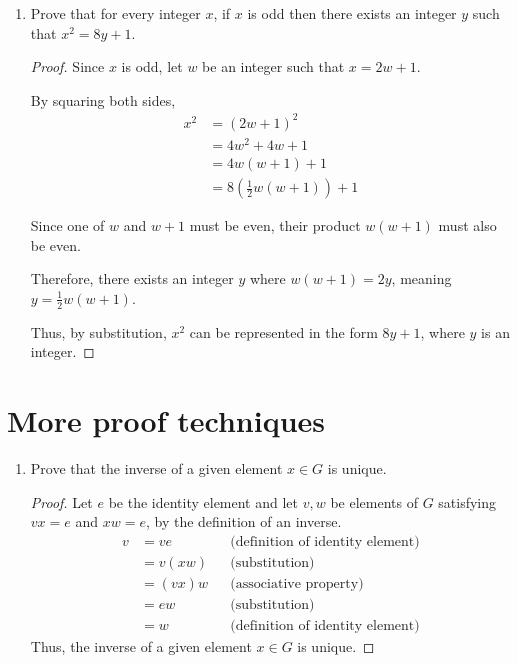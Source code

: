 \documentclass{article}
\begin{document}
\begin{enumerate}
  \item Prove that for every integer $x$, if $x$ is odd then there
    exists an integer $y$ such that $x^2 = 8y + 1$.

    \begin{proof}
      Since $x$ is odd, let $w$ be an integer such that $x=2w+1$.

      By squaring both sides,
      \begin{align}
        x^2 &= (2w+1)^2 \\
        &= 4w^2+4w+1 \\
        &= 4w(w+1)+1 \\
        &= 8(\frac{1}{2}w(w+1))+1
      \end{align}

      Since one of $w$ and $w+1$ must be even, their product $w(w+1)$
      must also be even.

      Therefore, there exists an integer $y$ where $w(w+1)=2y$,
      meaning $y=\frac{1}{2}w(w+1)$.

      Thus, by substitution, $x^2$ can be represented in the form
      $8y+1$, where $y$ is an integer.
    \end{proof}

\end{enumerate}

\section{More proof techniques}

\begin{enumerate}

  \item Prove that the inverse of a given element $x \in G$ is unique.

    \begin{proof}
      Let $e$ be the identity element and let $v,w$ be elements of
      $G$ satisfying $vx=e$ and $xw=e$, by the definition of an inverse.
      \begin{align}
        v &= ve & & \text{(definition of identity element)} \\
        &= v(xw) & & \text{(substitution)} \\
        &= (vx)w & & \text{(associative property)} \\
        &= ew & & \text{(substitution)} \\
        &= w & & \text{(definition of identity element)}
      \end{align}
      Thus, the inverse of a given element $x \in G$ is unique.
    \end{proof}

\end{enumerate}
\end{document}
